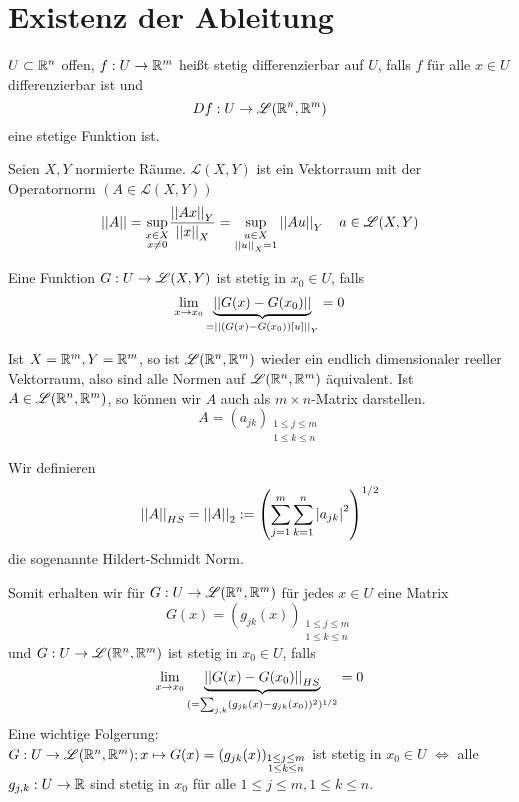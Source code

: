 \documentclass[../ana2.tex]{subfiles}
\begin{document}
\setcounter{section}{11}
\section{Existenz der Ableitung}
\begin{defi}
    \(U \subset \mathbb{R}^n \) offen, \(f:U\rightarrow \mathbb{R}^m\) heißt
    stetig differenzierbar auf \(U\), falls \(f\) für alle
    \(x \in U\) differenzierbar ist und    
    \[ Df:U\rightarrow \mathscr{L}(\mathbb{R}^n, \mathbb{R}^m) \]
    eine stetige Funktion ist.
\end{defi}
\begin{bem}
    Seien \(X, Y\) normierte Räume. 
    \( \mathscr{L}(X,Y) \) ist ein Vektorraum mit
    der Operatornorm \( (A \in \mathscr{L}(X,Y)) \)
    \[ \left|\left|A\right|\right| = \underset{\substack{x\in X\\x\neq 0}}{\sup}
    \frac{\left|\left|Ax\right|\right|_Y}{\left|\left|x\right|\right|_X} 
    = \underset{\substack{u\in X\\ \left|\left|u\right|\right|_X = 1}}{\sup}
    \left|\left|Au\right|\right|_Y
    \quad a \in \mathscr{L}(X,Y) \]
\end{bem}
\begin{bem}
    Eine Funktion \(G:U\rightarrow \mathscr{L}(X,Y)\) ist 
    stetig in \(x_0 \in U\), falls 
    \[ \lim\limits_{x\rightarrow{}x_0} \underbrace{\left|\left|G(x) - G(x_0)\right|\right|}_{
        = \left|\left|(G(x) - G(x_0))[u]\right|\right|_Y
    } = 0 \]
\end{bem}
Ist \(X=\mathbb{R}^m, Y = \mathbb{R}^m\), so ist \(\mathscr{L}(\mathbb{R}^n, \mathbb{R}^m)\)
wieder ein endlich dimensionaler reeller Vektorraum, also sind 
alle Normen auf \( \mathscr{L}(\mathbb{R}^n, \mathbb{R}^m) \) äquivalent.
Ist \( A \in \mathscr{L}(\mathbb{R}^n, \mathbb{R}^m) \), so können wir \(A\) 
auch als \( m \times n \)-Matrix darstellen.
\[ A = (a_{jk})_{\substack{ 1 \leq j \leq m\\1 \leq k \leq n }} \]
\begin{defi*}
    Wir definieren
    \[ \left|\left|A\right|\right|_{HS} = \left|\left|A\right|\right|_2 := \left( 
        \sum_{j=1}^m \sum_{k=1}^n \left|a_{jk}\right|^2 \right)^{1/2} \]
    die sogenannte Hildert-Schmidt Norm.
\end{defi*}
Somit erhalten wir für \( G:U\rightarrow \mathscr{L}(\mathbb{R}^n, \mathbb{R}^m) \) 
für jedes \( x \in U \) eine Matrix
\[ G(x) = (g_{jk}(x))_{\substack{1 \leq j \leq m \\ 
1 \leq k \leq n}} \]
und \( G:U\rightarrow \mathscr{L}(\mathbb{R}^n, \mathbb{R}^m) \) ist stetig 
in \(x_0 \in U\), falls
\[ \lim\limits_{x\rightarrow{}x_0} \underbrace{\left|\left|G(x) - G(x_0)\right|\right|_{HS}}_{
    (= \sum_{j,k} (g_{jk}(x)-g_{jk}(x_0))^2)^{1/2}} = 0 \]
Eine wichtige Folgerung:\\
\( G:U\rightarrow \mathscr{L}(\mathbb{R}^n, \mathbb{R}^m); x \mapsto G(x) 
= (g_{jk}(x))_{\substack{1 \leq j \leq m 
\\ 1 \leq k \leq n}} \)
ist stetig in \( x_0 \in U \)
\( \Leftrightarrow \) alle \( g_{j,k}:U\rightarrow \mathbb{R} \) 
sind stetig in \(x_0\) für alle 
\( 1 \leq j \leq m, 1 \leq k \leq n \).\\
\end{document}

